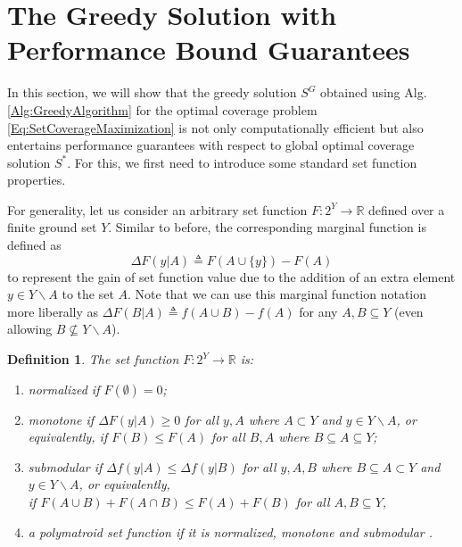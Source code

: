 \documentclass[letterpaper, 10 pt, conference]{ieeeconf}
\newcommand{\R}{\mathbb{R}}
\newtheorem{definition}{Definition}
\begin{document}
\section{The Greedy Solution with Performance Bound Guarantees}
\label{Sec:Preliminaries}

In this section, we will show that the greedy solution $S^G$ obtained using Alg. \ref{Alg:GreedyAlgorithm} for the optimal coverage problem \eqref{Eq:SetCoverageMaximization} is not only computationally efficient but also entertains performance guarantees with respect to global optimal coverage solution $S^*$. For this, we first need to introduce some standard set function properties.

For generality, let us consider an arbitrary set function $F:2^Y \rightarrow \R$ defined over a finite ground set $Y$. Similar to before, the corresponding marginal function is defined as 
\begin{equation}
    \Delta F(y \vert A) \triangleq F(A\cup\{y\}) - F(A)
\end{equation}
to represent the gain of set function value due to the addition of an extra element $y \in Y \backslash A$ to the set $A$. Note that we can use this marginal function notation more liberally as $\Delta F(B \vert A) \triangleq f(A\cup B) - f(A)$ for any $A, B \subseteq Y$ (even allowing $B \not\subseteq Y\backslash A$).  


\begin{definition} \cite{WelikalaJ02021} \label{Def:Submodularity} The set function $F:2^Y \rightarrow \R$ is:
\begin{enumerate}
    \item \emph{normalized} if $F(\emptyset) = 0$;
    \item \emph{monotone} if $\Delta F(y \vert A)\geq 0$ for all $y,A$ where $A \subset Y$ and $y\in Y\backslash A$, or equivalently, if $F(B) \leq F(A)$ for all $B,A$ where $B \subseteq A \subseteq Y$;
    \item \emph{submodular} if $\Delta f(y\vert A) \leq \Delta f(y\vert B)$ for all $y,A,B$ where $B\subseteq A \subset Y$ and $y\in Y \backslash A$, or equivalently, \\if $F(A\cup B) + F(A\cap B) \leq F(A) + F(B)$ for all $A,B\subseteq Y$,
    \item a \emph{polymatroid} set function if it is normalized, monotone and submodular \cite{Liu2018}. 
\end{enumerate}
\end{definition}
\end{document}
